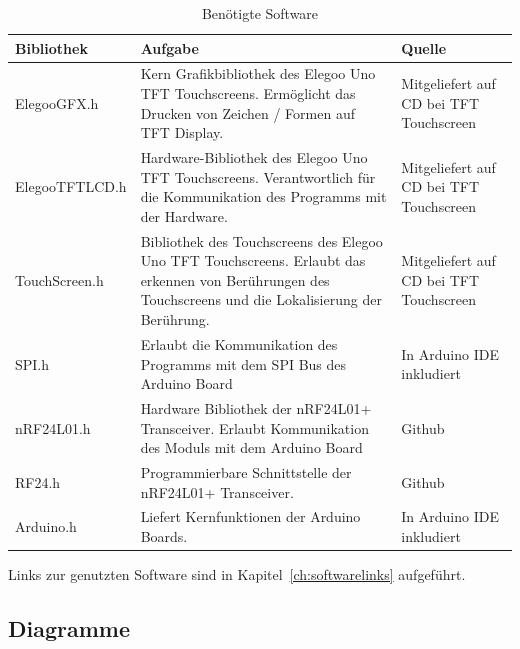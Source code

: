 \documentclass[a4paper, 11pt]{scrartcl}
\begin{document}
\begin{small}
\begin{table}[H]
    \caption{Benötigte Software}\label{tab:software}
    \begin{tabular}{|p{}|p{}|p{}|}
        \hline
        \textbf{Bibliothek} & \textbf{Aufgabe} & \textbf{Quelle}
        \\
        \hline\hline
        Elegoo\text{\_}GFX.h 
        & 
        Kern Grafikbibliothek des Elegoo Uno TFT Touchscreens. Ermöglicht das Drucken von Zeichen / Formen auf TFT Display.
        &
        Mitgeliefert auf CD bei TFT Touchscreen
        \\
        \hline
        Elegoo\text{\_}TFTLCD.h
        &
        Hardware-Bibliothek des Elegoo Uno TFT Touchscreens. Verantwortlich für die Kommunikation des Programms mit der Hardware.
        &
        Mitgeliefert auf CD bei TFT Touchscreen
        \\
        \hline
        TouchScreen.h
        &
        Bibliothek des Touchscreens des Elegoo Uno TFT Touchscreens. Erlaubt das erkennen von Berührungen des Touchscreens und die Lokalisierung der
        Berührung.
        &
        Mitgeliefert auf CD bei TFT Touchscreen
        \\
        \hline
        SPI.h
        &
        Erlaubt die Kommunikation des Programms mit dem SPI Bus des Arduino Board
        &
        In Arduino IDE inkludiert
        \\
        \hline
        nRF24L01.h
        &
        Hardware Bibliothek der nRF24L01+ Transceiver. Erlaubt Kommunikation des Moduls mit dem Arduino Board
        &
        Github %
        \\
        \hline
        RF24.h
        &
        Programmierbare Schnittstelle der nRF24L01+ Transceiver. 
        &
        Github
        \\
        \hline
        Arduino.h
        &
        Liefert Kernfunktionen der Arduino Boards.
        &
        In Arduino IDE inkludiert
        \\
        \hline
    \end{tabular}
\end{table}
Links zur genutzten Software sind in Kapitel~\ref{ch:softwarelinks} aufgeführt.

\subsection{Diagramme}




\end{small}
\end{document}
